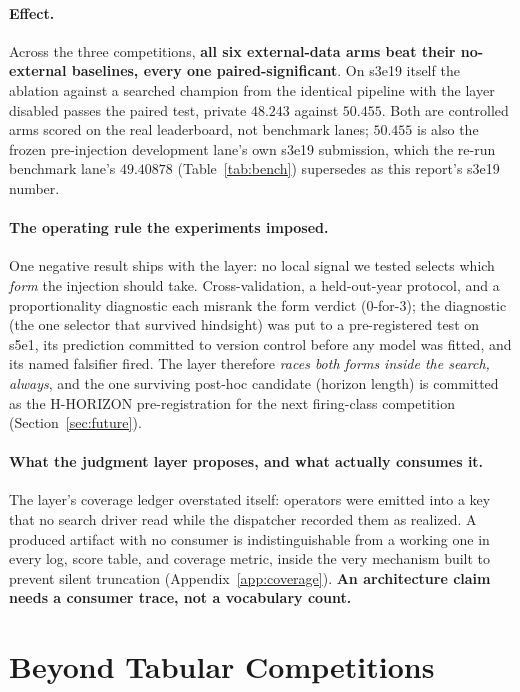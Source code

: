 \documentclass[11pt,a4paper]{article}
\begin{document}
\paragraph{Effect.} Across the three competitions, \textbf{all six external-data arms beat
their no-external baselines, every one paired-significant}. On s3e19 itself the
ablation against a searched champion from the identical pipeline with the layer disabled passes
the paired test, private $48.243$ against $50.455$. Both are controlled arms scored on the real
leaderboard, not benchmark lanes; $50.455$ is also the frozen pre-injection development lane's own
s3e19 submission, which the re-run benchmark lane's $49.40878$ (Table~\ref{tab:bench}) supersedes
as this report's s3e19 number.

\paragraph{The operating rule the experiments imposed.} One negative result ships with the
layer: no local signal we tested selects which \emph{form} the injection should take.
Cross-validation, a held-out-year protocol, and a proportionality diagnostic each misrank the
form verdict (0-for-3); the diagnostic (the one selector that survived hindsight) was
put to a pre-registered test on s5e1, its prediction committed to version control before any
model was fitted, and its named falsifier fired. The layer therefore \emph{races both forms
inside the search, always}, and the one surviving post-hoc candidate (horizon length) is
committed as the H-HORIZON pre-registration for the next firing-class competition
(Section~\ref{sec:future}).

\paragraph{What the judgment layer proposes, and what actually consumes it.} The layer's coverage
ledger overstated itself: operators were emitted into a key that no search driver read while the
dispatcher recorded them as realized. A produced artifact with no consumer is indistinguishable
from a working one in every log, score table, and coverage metric, inside the very mechanism
built to prevent silent truncation (Appendix~\ref{app:coverage}). \textbf{An architecture claim
needs a consumer trace, not a vocabulary count.}

\section{Beyond Tabular Competitions}
\label{sec:exp7run2}
\end{document}
